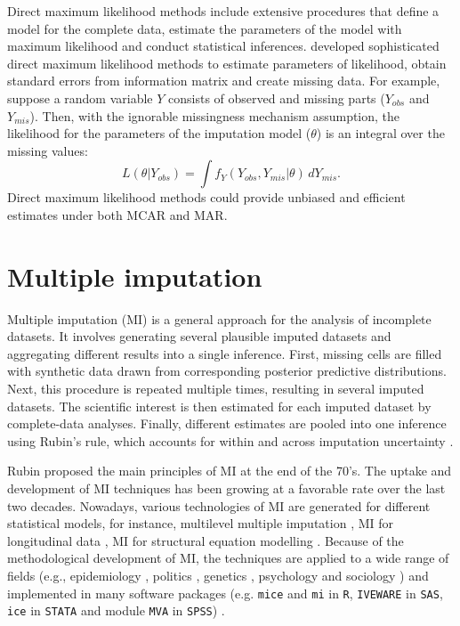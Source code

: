 Direct maximum likelihood methods include extensive procedures that define a model for the complete data, estimate the parameters of the model with maximum likelihood and conduct statistical inferences. \citet{little2019statistical} developed sophisticated direct maximum likelihood methods to estimate parameters of likelihood, obtain standard errors from information matrix and create missing data. For example, suppose a random variable $Y$ consists of observed and missing parts ($Y_{obs}$ and $Y_{mis}$). Then, with the ignorable missingness mechanism assumption, the likelihood for the parameters of the imputation model ($\theta$) is an integral over the missing values:
\begin{equation*}
	L(\theta | Y_{obs}) =  \int f_{Y}(Y_{obs}, Y_{mis} | \theta)  \,dY_{mis}. 
\end{equation*}
Direct maximum likelihood methods could provide unbiased and efficient estimates under both MCAR and MAR. 

\section{Multiple imputation}
Multiple imputation (MI) is a general approach for the analysis of incomplete datasets. It involves generating several plausible imputed datasets and aggregating different results into a single inference. First, missing cells are filled with synthetic data drawn from corresponding posterior predictive distributions. Next, this procedure is repeated multiple times, resulting in several imputed datasets. The scientific interest is then estimated for each imputed dataset by complete-data analyses. Finally, different estimates are pooled into one inference using Rubin’s rule, which accounts for within and across imputation uncertainty \citep{RubinD1987}.

Rubin proposed the main principles of MI at the end of the 70's. The uptake and development of MI techniques has been growing at a favorable rate over the last two decades. Nowadays, various technologies of MI are generated for different statistical models, for instance, multilevel multiple imputation \citep{longford2001multilevel}, MI for longitudinal data \citep{twisk2002attrition, demirtas2004modeling}, MI for structural equation modelling \citep{olinsky2003comparative, allison2003missing}. Because of the methodological development of MI, the techniques are applied to a wide range of fields (e.g., epidemiology \citep{mueller2008injuries}, politics \citep{tanasoiu2008determinants}, genetics \citep{souverein2006multiple}, psychology \citep{sundell2008transportability} and sociology \citep{finke2008cross}) and implemented in many software packages (e.g. \texttt{mice} and \texttt{mi} in \texttt{R}, \texttt{IVEWARE} in \texttt{SAS}, \texttt{ice} in \texttt{STATA} and module \texttt{MVA} in \texttt{SPSS}) \citep{Buuren2011, azur2011multiple}.  

